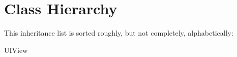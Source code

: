 \section{Class Hierarchy}
This inheritance list is sorted roughly, but not completely, alphabetically\+:\begin{DoxyCompactList}
\item U\+I\+View\begin{DoxyCompactList}
\item {}
\end{DoxyCompactList}
\end{DoxyCompactList}
